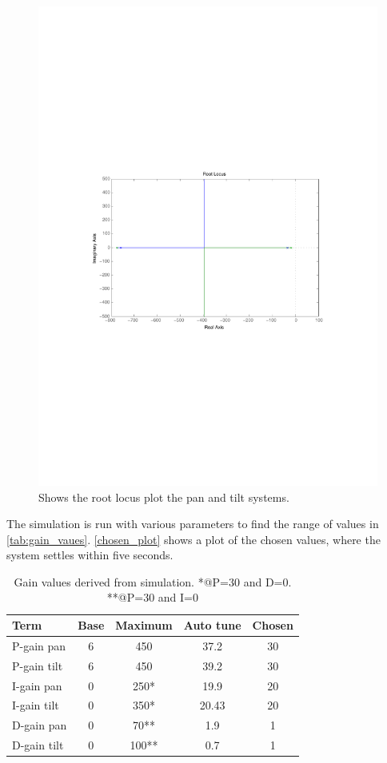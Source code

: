 \begin{figure}[htb]
	\centering
	\includegraphics[width=\textwidth,trim=0 270 0 270]{graphics/rlocus_plot.pdf} %
	\caption{Shows the root locus plot the pan and tilt systems.}
	\label{fig:rlocus_plot}			
\end{figure}

The simulation is run with various parameters to find the range of values in \ref{tab:gain_vaues}. \ref{chosen_plot} shows a plot of the chosen values, where the system settles within five seconds.

\begin{table}[htb]				
	\centering
	\begin{tabular}{lcccc}			
	Term & Base & Maximum & Auto tune & Chosen \\			
	\midrule											
P-gain pan& 6 & 450 & 37.2 & 30\\
P-gain tilt& 6 & 450 & 39.2 & 30\\
I-gain pan& 0 & 250* & 19.9  & 20\\
I-gain tilt& 0 & 350* & 20.43 & 20\\
D-gain pan& 0 & 70** & 1.9 & 1\\
D-gain tilt& 0 & 100** & 0.7 & 1\\
	\end{tabular}
	\caption{Gain values derived from simulation. *@P=30 and D=0. **@P=30 and I=0}				
	\label{tab:gain_values}			
\end{table}

